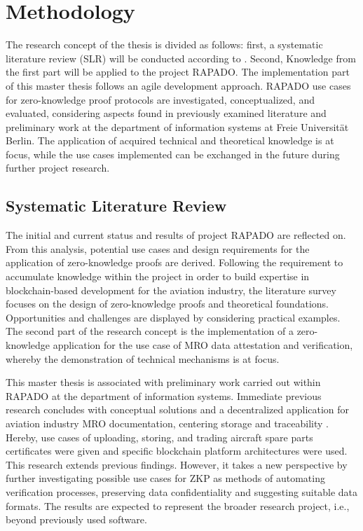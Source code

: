 \chapter{Methodology}
The research concept of the thesis is divided as follows: first, a systematic literature review (SLR) will be conducted according to \cite{HevnerAR2004DSiI, vomBrockeJan2019TDgs, Webster2002AnalyzingTP}. Second, Knowledge from the first part will be applied to the project RAPADO. The implementation part of this master thesis follows an agile development approach. RAPADO use cases for zero-knowledge proof protocols are investigated, conceptualized, and evaluated, considering aspects found in previously examined literature and preliminary work at the department of information systems at Freie Universit{\"a}t Berlin. The application of acquired technical and theoretical knowledge is at focus, while the use cases implemented can be exchanged in the future during further project research. 

\section{Systematic Literature Review}
The initial and current status and results of project RAPADO are reflected on. From this analysis, potential use cases and design requirements for the application of zero-knowledge proofs are derived. Following the requirement to accumulate knowledge within the project in order to build expertise in blockchain-based development for the aviation industry, the literature survey focuses on the design of zero-knowledge proofs and theoretical foundations. Opportunities and challenges are displayed by considering practical examples. The second part of the research concept is the implementation of a zero-knowledge application for the use case of MRO data attestation and verification, whereby the demonstration of technical mechanisms is at focus.

This master thesis is associated with preliminary work carried out within RAPADO at the department of information systems. Immediate previous research concludes with conceptual solutions and a decentralized application for aviation industry MRO documentation, centering storage and traceability \citep{ZedelJ}. Hereby, use cases of uploading, storing, and trading aircraft spare parts certificates were given and specific blockchain platform architectures were used. This research extends previous findings. However, it takes a new perspective by further investigating possible use cases for ZKP as methods of automating verification processes, preserving data confidentiality and suggesting suitable data formats. The results are expected to represent the broader research project, i.e., beyond previously used software.

